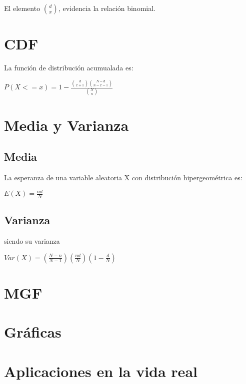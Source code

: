 El elemento ${d \choose x}$, evidencia la relación binomial.

\section{CDF}
La función de distribución acumualada es:

\begin{center}
	$P(X <= \textit{x})	= 1 - {\frac{ {d \choose x + 1} {N - d \choose n- x -1} }{ {N \choose n} }} $
\end{center}

\section{Media y Varianza}
\subsection{Media}
La esperanza de una variable aleatoria X con distribución hipergeométrica es:
\begin{center}
	$E(X) = {\frac{n d}{N}}$
\end{center}

\subsection{Varianza}
siendo su varianza
\begin{center}
	$Var(X) = (\frac{N - n}{N - 1})(\frac{nd}{N})(1 - \frac{d}{N})$
\end{center}

\section{MGF}

\section{Gráficas}

\section{Aplicaciones en la vida real}

